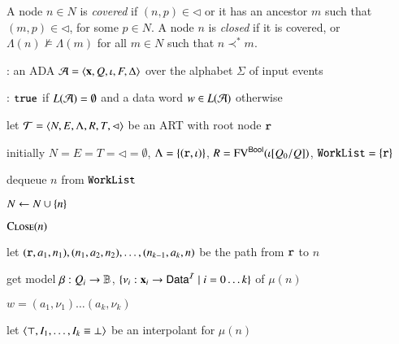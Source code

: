 \documentclass[10pt,conference,letterpaper,twocolumn]{IEEEtran}
\begin{document}
A node $n \in N$ is \emph{covered} if $(n,p) \in \lhd$ or it has an
ancestor $m$ such that $(m,p) \in \lhd$, for some $p \in N$. A node
$n$ is \emph{closed} if it is covered, or $\Lambda(n) \not\models
\Lambda(m)$ for all $m \in N$ such that $n \prec^* m$.

\begin{algorithm}[t!]
{\scriptsize\begin{algorithmic}[0]
  : an ADA $\mathcal{A} = \left\langle \mathbf x,Q,\iota,F,\Delta \right\rangle$
  over the alphabet $\Sigma$ of input events

  : $\mathtt{true}$ if $L(\mathcal{A})=\emptyset$ and a data word $w
  \in L(\mathcal{A})$ otherwise
\end{algorithmic}}

{\scriptsize\begin{algorithmic}[1] 

  \State let $\mathcal{T} = \left\langle N,E,\Lambda,R,T,\lhd \right\rangle$ be an ART with root
  node $\mathtt{r}$

  \State initially $N = E = T = \lhd = \emptyset$, $\Lambda =
  \left\{ (\mathtt{r},\iota) \right\}$, $R = \mathrm{FV}^{\mathsf{Bool}}(\iota[Q_0/Q])$,
  $\mathtt{WorkList}=\left\{ \mathtt{r} \right\}$
  
  \While{$\worklist \neq \emptyset$}
  \label{ln:impact-while}

  \State dequeue $n$ from $\mathtt{WorkList}$ 

  \State $N \leftarrow N \cup \left\{ n \right\}$

  \State $\Call{Close}{n}$
  \label{ln:close-worklist}


  \State let $(\mathtt{r},a_1,n_1),(n_1,a_2,n_2), \ldots,
  (n_{k-1},a_k,n)$ be the path from $\mathtt{r}$ to $n$

  \label{ln:impact-cex}


  \State get model $\beta : Q_i \rightarrow \mathbb{B}$, $\{\nu_i :
  \mathbf x_i \rightarrow \mathsf{Data}^{\mathcal{I}} \mid i=0\ldots k\}$ of $\mu(n)$

   $w = (a_1,\nu_1) \ldots (a_k,\nu_k)$

  \Else {}

  \State let $\left\langle \top,I_1,\ldots,I_k \equiv\bot \right\rangle$ be an interpolant for $\mu(n)$
  \label{ln:refine-begin}


\end{algorithmic}}
\end{algorithm}
\end{document}

